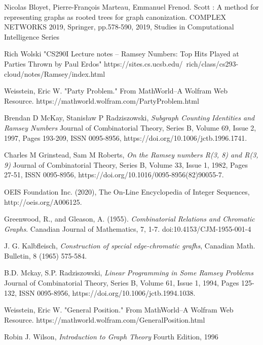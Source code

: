 \begin{thebibliography}{9}
       Nicolas Bloyet, Pierre-François Marteau, Emmanuel Frenod. Scott : A method for representing graphs
      as rooted trees for graph canonization. COMPLEX NETWORKS 2019, Springer, pp.578-590, 2019,
      Studies in Computational Intelligence Series
      
       Rich Wolski "CS290I Lecture notes -- Ramsey Numbers: Top Hits Played at Parties Thrown by Paul Erdos" https://sites.cs.ucsb.edu/~rich/class/cs293-cloud/notes/Ramsey/index.html

 Weisstein, Eric W. "Party Problem." From MathWorld--A Wolfram Web Resource. https://mathworld.wolfram.com/PartyProblem.html 
 
 Brendan D McKay, Stanisław P Radziszowski,
\textit{Subgraph Counting Identities and Ramsey Numbers}
Journal of Combinatorial Theory, Series B,
Volume 69, Issue 2,
1997,
Pages 193-209,
ISSN 0095-8956,
https://doi.org/10.1006/jctb.1996.1741.

Charles M Grinstead, Sam M Roberts,
\textit{On the Ramsey numbers R(3, 8) and R(3, 9)}
Journal of Combinatorial Theory, Series B,
Volume 33, Issue 1,
1982,
Pages 27-51,
ISSN 0095-8956,
https://doi.org/10.1016/0095-8956(82)90055-7.

       OEIS Foundation Inc. (2020), The On-Line Encyclopedia of Integer Sequences, http://oeis.org/A006125.
	   
Greenwood, R., and Gleason, A. (1955). \textit{Combinatorial Relations and Chromatic Graphs}. Canadian Journal of Mathematics, 7, 1-7. doi:10.4153/CJM-1955-001-4

J. G. Kalbfleisch, \textit{Construction of special edge-chromatic grafhs}, Canadian Math. Bulletin, 8 (1965) 575-584.

B.D. Mckay, S.P. Radziszowski,
\textit{Linear Programming in Some Ramsey Problems}
Journal of Combinatorial Theory, Series B,
Volume 61, Issue 1,
1994,
Pages 125-132,
ISSN 0095-8956,
https://doi.org/10.1006/jctb.1994.1038.

 Weisstein, Eric W. "General Position." From MathWorld--A Wolfram Web Resource. https://mathworld.wolfram.com/GeneralPosition.html 

Robin J. Wilson,
\textit{Introduction to Graph Theory} Fourth Edition, 1996







  \end{thebibliography}